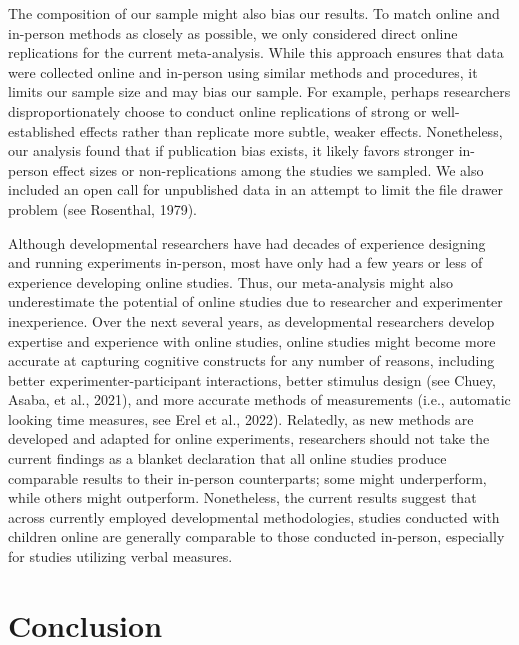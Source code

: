 \documentclass[
  man,floatsintext]{apa6}
\begin{document}
The composition of our sample might also bias our results. To match online and in-person methods as closely as possible, we only considered direct online replications for the current meta-analysis. While this approach ensures that data were collected online and in-person using similar methods and procedures, it limits our sample size and may bias our sample. For example, perhaps researchers disproportionately choose to conduct online replications of strong or well-established effects rather than replicate more subtle, weaker effects. Nonetheless, our analysis found that if publication bias exists, it likely favors stronger in-person effect sizes or non-replications among the studies we sampled. We also included an open call for unpublished data in an attempt to limit the file drawer problem (see Rosenthal, 1979).

Although developmental researchers have had decades of experience designing and running experiments in-person, most have only had a few years or less of experience developing online studies. Thus, our meta-analysis might also underestimate the potential of online studies due to researcher and experimenter inexperience. Over the next several years, as developmental researchers develop expertise and experience with online studies, online studies might become more accurate at capturing cognitive constructs for any number of reasons, including better experimenter-participant interactions, better stimulus design (see Chuey, Asaba, et al., 2021), and more accurate methods of measurements (i.e., automatic looking time measures, see Erel et al., 2022). Relatedly, as new methods are developed and adapted for online experiments, researchers should not take the current findings as a blanket declaration that all online studies produce comparable results to their in-person counterparts; some might underperform, while others might outperform. Nonetheless, the current results suggest that across currently employed developmental methodologies, studies conducted with children online are generally comparable to those conducted in-person, especially for studies utilizing verbal measures.

\hypertarget{conclusion}{%
\section{Conclusion}\label{conclusion}}
\end{document}
